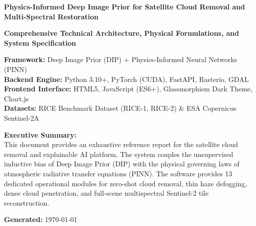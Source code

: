 \documentclass[11pt,a4paper]{article}
\begin{document}
\begin{titlepage}
    \centering
    \vspace*{1.2cm}
    
    {\Huge \bfseries \color{primaryblue} Physics-Informed Deep Image Prior for Satellite Cloud Removal and Multi-Spectral Restoration\par}
    \vspace{0.8cm}
    {\Large \textbf{Comprehensive Technical Architecture, Physical Formulations, and System Specification}\par}
    
    \vspace{1.2cm}
    
    \begin{tcolorbox}[colback=lightgraybg,colframe=primaryblue,width=0.95\textwidth,arc=3mm]
        \centering
        \textbf{Framework:} Deep Image Prior (DIP) + Physics-Informed Neural Networks (PINN)\\
        \textbf{Backend Engine:} Python 3.10+, PyTorch (CUDA), FastAPI, Rasterio, GDAL\\
        \textbf{Frontend Interface:} HTML5, JavaScript (ES6+), Glassmorphism Dark Theme, Chart.js\\
        \textbf{Datasets:} RICE Benchmark Dataset (RICE-1, RICE-2) \& ESA Copernicus Sentinel-2A
    \end{tcolorbox}
    
    \vspace{1.5cm}
    
    \begin{minipage}{0.9\textwidth}
    \textbf{Executive Summary:}\\
    \small
    This document provides an exhaustive reference report for the satellite cloud removal and explainable AI platform. The system couples the unsupervised inductive bias of Deep Image Prior (DIP) with the physical governing laws of atmospheric radiative transfer equations (PINN). The software provides 13 dedicated operational modules for zero-shot cloud removal, thin haze defogging, dense cloud penetration, and full-scene multispectral Sentinel-2 tile reconstruction.
    \end{minipage}
    
    \vfill
    {\large \textbf{Generated:} \today \par}
\end{titlepage}

\tableofcontents
\newpage

\end{document}
